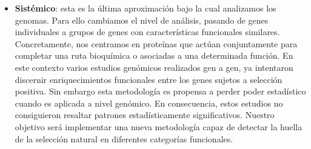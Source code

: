 \begin{itemize}
\item \textbf{Sistémico}: esta es la última aproximación bajo la cual analizamos los genomas. Para ello cambiamos el nivel de análisis, pasando de genes individuales a grupos de genes con características funcionales similares. Concretamente, nos centramos en proteínas que actúan conjuntamente para completar una ruta bioquímica o asociadas a una determinada función. En este contexto varios estudios genómicos realizados gen a gen, ya intentaron discernir enriquecimientos funcionales entre los genes sujetos a selección positiva. Sin embargo esta metodología es propensa a perder poder estadístico cuando es aplicada a nivel genómico. En consecuencia, estos estudios no consiguieron resaltar patrones estadísticamente significativos. Nuestro objetivo será implementar una nueva metodología capaz de detectar la huella de la selección natural en diferentes categorías funcionales.
\end {itemize}

